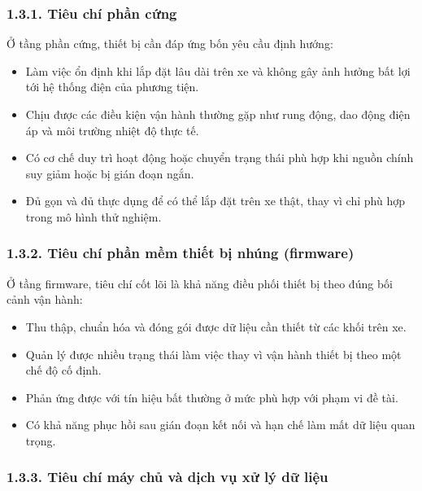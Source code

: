 \documentclass[a4paper]{extarticle}
\providecommand{\tightlist}{%
  \setlength{\itemsep}{0pt}\setlength{\parskip}{0pt}}
\begin{document}
\subsubsection{1.3.1. Tiêu chí phần cứng}\label{tiuxeau-chuxed-phux1ea7n-cux1ee9ng}

Ở tầng phần cứng, thiết bị cần đáp ứng bốn yêu cầu định hướng:

\begin{itemize}
\tightlist
\item
  Làm việc ổn định khi lắp đặt lâu dài trên xe và không gây ảnh hưởng bất
  lợi tới hệ thống điện của phương tiện.
\item
  Chịu được các điều kiện vận hành thường gặp như rung động, dao động
  điện áp và môi trường nhiệt độ thực tế.
\item
  Có cơ chế duy trì hoạt động hoặc chuyển trạng thái phù hợp khi nguồn
  chính suy giảm hoặc bị gián đoạn ngắn.
\item
  Đủ gọn và đủ thực dụng để có thể lắp đặt trên xe thật, thay vì chỉ phù
  hợp trong mô hình thử nghiệm.
\end{itemize}

\subsubsection{1.3.2. Tiêu chí phần mềm thiết bị nhúng (firmware)}\label{tiuxeau-chuxed-phux1ea7n-mux1ec1m-thiux1ebft-bux1ecb-nhuxfang-firmware}

Ở tầng firmware, tiêu chí cốt lõi là khả năng điều phối thiết bị theo
đúng bối cảnh vận hành:

\begin{itemize}
\tightlist
\item
  Thu thập, chuẩn hóa và đóng gói được dữ liệu cần thiết từ các khối trên
  xe.
\item
  Quản lý được nhiều trạng thái làm việc thay vì vận hành thiết bị theo
  một chế độ cố định.
\item
  Phản ứng được với tín hiệu bất thường ở mức phù hợp với phạm vi đề tài.
\item
  Có khả năng phục hồi sau gián đoạn kết nối và hạn chế làm mất dữ liệu
  quan trọng.
\end{itemize}

\subsubsection{1.3.3. Tiêu chí máy chủ và dịch vụ xử lý dữ liệu}\label{tiuxeau-chuxed-muxe1y-chux1ee7-vuxe0-dux1ecbch-vux1ee5-xux1eed-luxfd-dux1eef-liux1ec7u}
\end{document}
